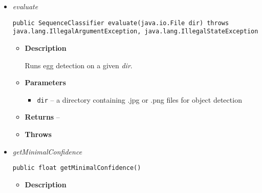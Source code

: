 {{{{\begin{itemize}
{\begin{itemize}
{Closes the EggDetector session. This instance of EggDetector will not be usable again.
}
\item{{\bf  Throws}
}%
\end{itemize}
}%
\item{ 
{\textit{evaluate}}\\
\begin{lstlisting}[frame=none]
public SequenceClassifier evaluate(java.io.File dir) throws java.lang.IllegalArgumentException, java.lang.IllegalStateException\end{lstlisting} %
\begin{itemize}
\item{
{\bf  Description}



Runs egg detection on a given \textit{ dir}.
}
\item{
{\bf  Parameters}
  \begin{itemize}
   \item{
\texttt{dir} -- a directory containing .jpg or .png files for object detection}
  \end{itemize}
}%
\item{{\bf  Returns} -- 
 
}%
\item{{\bf  Throws}
}%
\end{itemize}
}%
\item{ 
{\textit{getMinimalConfidence}}\\
\begin{lstlisting}[frame=none]
public float getMinimalConfidence()\end{lstlisting} %
\begin{itemize}
\item{
{\bf  Description}



}
\end{itemize}}
\end{itemize}}}}}
